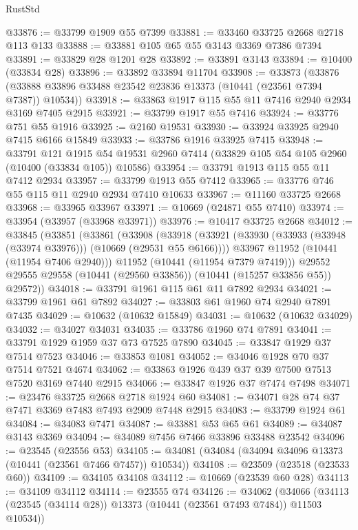 \begin{lexlean}{RustStd}
\begin{coremodule}
@33876 := @33799 @1909 @55 @7399
@33881 := @33460 @33725 @2668 @2718 @113 @133
@33888 := @33881 @105 @65 @55 @3143 @3369 @7386 @7394
@33891 := @33829 @28 @1201 @28
@33892 := @33891 @3143
@33894 := @10400 (@33834 @28)
@33896 := @33892 @33894 @11704
@33908 := @33873
    (@33876 (@33888 @33896 @33488 @23542 @23836 @13373 (@10441 (@23561 @7394 @7387)) @10534))
@33918 := @33863 @1917 @115 @55 @11 @7416 @2940 @2934 @3169 @7405 @2915
@33921 := @33799 @1917 @55 @7416
@33924 := @33776 @751 @55 @1916
@33925 := @2160 @19531
@33930 := @33924 @33925 @2940 @7415 @6166 @15849
@33933 := @33786 @1916 @33925 @7415
@33948 := @33791
    @121
    @1915
    @54
    @19531
    @2960
    @7414
    (@33829 @105 @54 @105 @2960 (@10400 (@33834 @105)) @10586)
@33954 := @33791 @1913 @115 @55 @11 @7412 @2934
@33957 := @33799 @1913 @55 @7412
@33965 := @33776 @746 @55 @115 @11 @2940 @2934 @7410 @10633
@33967 := @11160 @33725 @2668
@33968 := @33965 @33967
@33971 := @10669 (@24871 @55 @7410)
@33974 := @33954 (@33957 (@33968 @33971))
@33976 := @10417 @33725 @2668
@34012 := @33845
    (@33851
      (@33861
        (@33908
          (@33918
            (@33921 (@33930 (@33933 (@33948 (@33974 @33976))) (@10669 (@29531 @55 @6166))))
            @33967
            @11952
            (@10441 (@11954 @7406 @2940)))
          @11952
          (@10441 (@11954 @7379 @7419)))
        @29552
        @29555
        @29558
        (@10441 (@29560 @33856))
        (@10441 (@15257 @33856 @55))
        @29572))
@34018 := @33791 @1961 @115 @61 @11 @7892 @2934
@34021 := @33799 @1961 @61 @7892
@34027 := @33803 @61 @1960 @74 @2940 @7891 @7435
@34029 := @10632 (@10632 @15849)
@34031 := @10632 (@10632 @34029)
@34032 := @34027 @34031
@34035 := @33786 @1960 @74 @7891
@34041 := @33791 @1929 @1959 @37 @73 @7525 @7890
@34045 := @33847 @1929 @37 @7514 @7523
@34046 := @33853 @1081
@34052 := @34046 @1928 @70 @37 @7514 @7521 @4674
@34062 := @33863 @1926 @439 @37 @39 @7500 @7513 @7520 @3169 @7440 @2915
@34066 := @33847 @1926 @37 @7474 @7498
@34071 := @23476 @33725 @2668 @2718 @1924 @60
@34081 := @34071 @28 @74 @37 @7471 @3369 @7483 @7493 @2909 @7448 @2915
@34083 := @33799 @1924 @61
@34084 := @34083 @7471
@34087 := @33881 @53 @65 @61
@34089 := @34087 @3143 @3369
@34094 := @34089 @7456 @7466 @33896 @33488 @23542
@34096 := @23545 (@23556 @53)
@34105 := @34081 (@34084 (@34094 @34096 @13373 (@10441 (@23561 @7466 @7457)) @10534))
@34108 := @23509 (@23518 (@23533 @60))
@34109 := @34105 @34108
@34112 := @10669 (@23539 @60 @28)
@34113 := @34109 @34112
@34114 := @23555 @74
@34126 := @34062
    (@34066 (@34113 (@23545 (@34114 @28)) @13373 (@10441 (@23561 @7493 @7484)) @11503 @10534))

\end{coremodule}
\end{lexlean}
